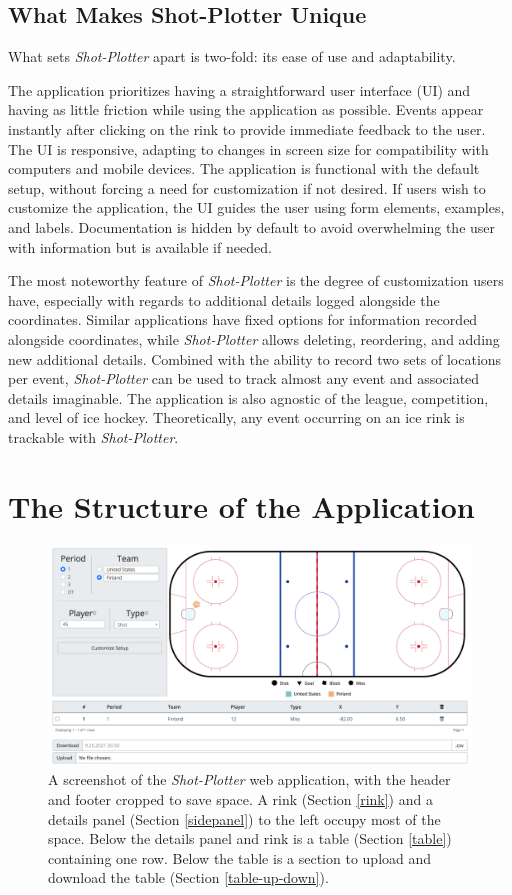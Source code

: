\documentclass[letterpaper]{article}
\begin{document}
\subsection{What Makes Shot-Plotter Unique}
What sets \textit{Shot-Plotter} apart is two-fold: its ease of use and adaptability. 

The application prioritizes having a straightforward user interface (UI) and having as little friction while using the application as possible. Events appear instantly after clicking on the rink to provide immediate feedback to the user. The UI is responsive, adapting to changes in screen size for compatibility with computers and mobile devices. The application is functional with the default setup, without forcing a need for customization if not desired. If users wish to customize the application, the UI guides the user using form elements, examples, and labels. Documentation is hidden by default to avoid overwhelming the user with information but is available if needed.

The most noteworthy feature of \textit{Shot-Plotter} is the degree of customization users have, especially with regards to additional details logged alongside the coordinates. Similar applications have fixed options for information recorded alongside coordinates, while \textit{Shot-Plotter} allows deleting, reordering, and adding new additional details. Combined with the ability to record two sets of locations per event, \textit{Shot-Plotter} can be used to track almost any event and associated details imaginable. The application is also agnostic of the league, competition, and level of ice hockey. Theoretically, any event occurring on an ice rink is trackable with \textit{Shot-Plotter}.


\section{The Structure of the Application}

\begin{figure}[h!]
	\centering
	\includegraphics[width=1\linewidth]{images/full-screenshot}
	\caption{A screenshot of the \textit{Shot-Plotter} web application, with the header and footer cropped to save space. A rink (Section \ref{rink}) and a details panel (Section \ref{sidepanel}) to the left occupy most of the space. Below the details panel and rink is a table (Section \ref{table}) containing one row. Below the table is a section to upload and download the table (Section \ref{table-up-down}).}
	\label{fig:full-screenshot}
\end{figure}
\end{document}
